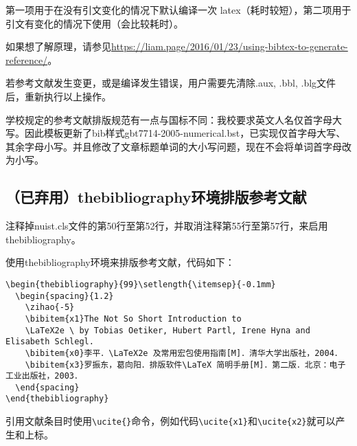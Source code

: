 第一项用于在没有引文变化的情况下默认编译一次 latex（耗时较短），第二项用于引文有变化的情况下使用（会比较耗时）。

如果想了解原理，请参见\url{https://liam.page/2016/01/23/using-bibtex-to-generate-reference/}。

若参考文献发生变更，或是编译发生错误，用户需要先清除.aux, .bbl, .blg文件后，重新执行以上操作。

学校规定的参考文献排版规范有一点与国标\cite{陈浩元2015GB}不同：我校要求英文人名仅首字母大写。因此模板更新了bib样式gbt7714-2005-numerical.bst，已实现仅首字母大写、其余字母小写。并且修改了文章标题单词的大小写问题，现在不会将单词首字母改为小写。

\subsection{（已弃用）thebibliography环境排版参考文献}

注释掉nuist.cls文件的第50行至第52行，并取消注释第55行至第57行，来启用thebibliography。

使用thebibliography环境来排版参考文献，代码如下：

{
\color{green!50!black}
\begin{lstlisting}[breaklines=true,]
\begin{thebibliography}{99}\setlength{\itemsep}{-0.1mm}
  \begin{spacing}{1.2}
    \zihao{-5}
    \bibitem{x1}The Not So Short Introduction to
    \LaTeX2e \ by Tobias Oetiker, Hubert Partl, Irene Hyna and Elisabeth Schlegl.
    \bibitem{x0}李平．\LaTeX2e 及常用宏包使用指南[M]．清华大学出版社，2004．
    \bibitem{x3}罗振东，葛向阳．排版软件\LaTeX 简明手册[M]．第二版．北京：电子工业出版社，2003．
  \end{spacing}
\end{thebibliography}
\end{lstlisting}
}

引用文献条目时使用\verb|\ucite{}|命令，例如代码\verb|\ucite{x1}|和\verb|\ucite{x2}|就可以产生\cite{x1}和\cite{x2}上标。
